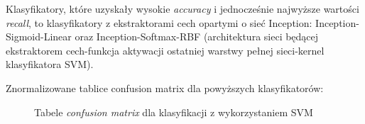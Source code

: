 \documentclass[polish,12pt]{aghthesis}
\begin{document}
\par Klasyfikatory, które uzyskały wysokie \textit{accuracy} i jednocześnie najwyższe wartości \textit{recall}, to klasyfikatory z ekstraktorami cech opartymi o sieć Inception: Inception-Sigmoid-Linear oraz Inception-Softmax-RBF (architektura sieci będącej ekstraktorem cech-funkcja aktywacji ostatniej warstwy pełnej sieci-kernel klasyfikatora SVM).

\noindent Znormalizowane tablice confusion matrix dla powyższych klasyfikatorów:
\begin{figure}[H]%
    \begin{adjustbox}{minipage=1.0\paperwidth, pagecenter}
    \centering
    \qquad
    \end{adjustbox}
    \label{fig:svm-matrices}
    \caption{Tabele \textit{confusion matrix} dla klasyfikacji z wykorzystaniem SVM}
\end{figure}
\end{document}
